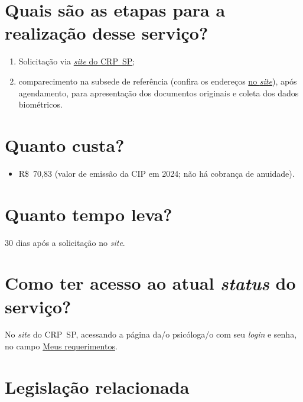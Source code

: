 \section{Quais são as etapas para a realização desse serviço?}

\begin{enumerate}
	\item
	Solicitação via \href{https://www.crpsp.org/agendamento}{\emph{site} do CRP~SP};
	\item
	comparecimento na subsede de referência (confira os endereços \href{https://www.crpsp.org/sede/index}{no \emph{site}}), após
	agendamento, para apresentação dos documentos originais e coleta dos dados biométricos.
\end{enumerate}

\section{Quanto custa?}

\begin{itemize}
	\item
	R\$~70,83 (valor de emissão da CIP em 2024; não há cobrança de anuidade).
\end{itemize}

\section{Quanto tempo leva?}

30 dias após a solicitação no \emph{site}.

\section{Como ter acesso ao atual \emph{status} do serviço?}

No \emph{site} do CRP~SP, acessando a página da/o psicóloga/o com seu \emph{login} e senha, no campo \href{https://cfpsp.brctotal.com/crp06_servicosonline/pgsRequerimento/MeusRequerimentos.aspx}{Meus requerimentos}.

\section{Legislação relacionada}

